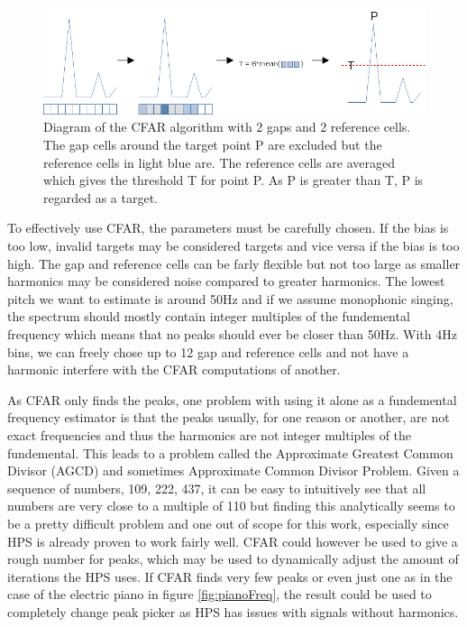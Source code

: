 \begin{figure}[ht]
    \centering
    \includegraphics[width=\textwidth]{./images/cfar.png}
    \caption{Diagram of the CFAR algorithm with 2 gaps and 2 reference cells. The gap cells around the target point P are excluded but the reference cells in light blue are. The reference cells are averaged which gives the threshold T for point P. As P is greater than T, P is regarded as a target.\label{fig:cfar}}
\end{figure}

To effectively use CFAR, the parameters must be carefully chosen. If the bias is too low, invalid targets may be considered targets and vice versa if the bias is too high. The gap and reference cells can be farly flexible but not too large as smaller harmonics may be considered noise compared to greater harmonics. The lowest pitch we want to estimate is around 50Hz and if we assume monophonic singing, the spectrum should mostly contain integer multiples of the fundemental frequency which means that no peaks should ever be closer than 50Hz. With 4Hz bins, we can freely chose up to 12 gap and reference cells and not have a harmonic interfere with the CFAR computations of another. 

As CFAR only finds the peaks, one problem with using it alone as a fundemental frequency estimator is that the peaks usually, for one reason or another, are not exact frequencies and thus the harmonics are not integer multiples of the fundemental. This leads to a problem called the Approximate Greatest Common Divisor (AGCD) and sometimes Approximate Common Divisor Problem. Given a sequence of numbers, 109, 222, 437, it can be easy to intuitively see that all numbers are very close to a multiple of 110 but finding this analytically seems to be a pretty difficult problem and one out of scope for this work, especially since HPS is already proven to work fairly well. CFAR could however be used to give a rough number for peaks, which may be used to dynamically adjust the amount of iterations the HPS uses. If CFAR finds very few peaks or even just one as in the case of the electric piano in figure \ref{fig:pianoFreq}, the result could be used to completely change peak picker as HPS has issues with signals without harmonics.

